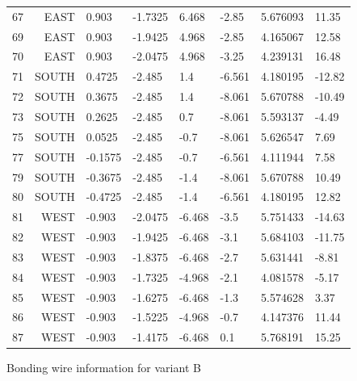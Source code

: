 \documentclass{cernatsnote}
\begin{document}
\begin{figure}
\begin{longtable}{l r l l l l l l}
67 & EAST & 0.903 & -1.7325 & 6.468 & -2.85 & 5.676093 & 11.35 \\
69 & EAST & 0.903 & -1.9425 & 4.968 & -2.85 & 4.165067 & 12.58 \\
70 & EAST & 0.903 & -2.0475 & 4.968 & -3.25 & 4.239131 & 16.48 \\
71 & SOUTH & 0.4725 & -2.485 & 1.4 & -6.561 & 4.180195 & -12.82 \\
72 & SOUTH & 0.3675 & -2.485 & 1.4 & -8.061 & 5.670788 & -10.49 \\
73 & SOUTH & 0.2625 & -2.485 & 0.7 & -8.061 & 5.593137 & -4.49 \\
75 & SOUTH & 0.0525 & -2.485 & -0.7 & -8.061 & 5.626547 & 7.69 \\
77 & SOUTH & -0.1575 & -2.485 & -0.7 & -6.561 & 4.111944 & 7.58 \\
79 & SOUTH & -0.3675 & -2.485 & -1.4 & -8.061 & 5.670788 & 10.49 \\
80 & SOUTH & -0.4725 & -2.485 & -1.4 & -6.561 & 4.180195 & 12.82 \\
81 & WEST & -0.903 & -2.0475 & -6.468 & -3.5 & 5.751433 & -14.63 \\
82 & WEST & -0.903 & -1.9425 & -6.468 & -3.1 & 5.684103 & -11.75 \\
83 & WEST & -0.903 & -1.8375 & -6.468 & -2.7 & 5.631441 & -8.81 \\
84 & WEST & -0.903 & -1.7325 & -4.968 & -2.1 & 4.081578 & -5.17 \\
85 & WEST & -0.903 & -1.6275 & -6.468 & -1.3 & 5.574628 & 3.37 \\
86 & WEST & -0.903 & -1.5225 & -4.968 & -0.7 & 4.147376 & 11.44 \\
87 & WEST & -0.903 & -1.4175 & -6.468 & 0.1 & 5.768191 & 15.25 \\


\bottomrule
\end{longtable}
\caption{Bonding wire information for variant B}

\end{figure}
\end{document}
